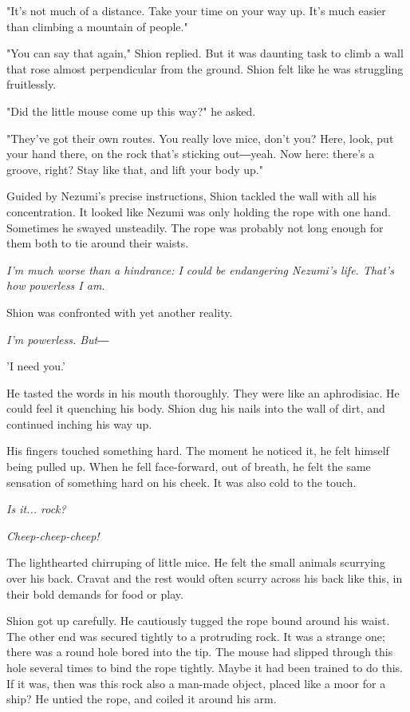 "It's not much of a distance. Take your time on your way up. It's much
easier than climbing a mountain of people."

"You can say that again," Shion replied. But it was daunting task to
climb a wall that rose almost perpendicular from the ground. Shion felt
like he was struggling fruitlessly.

"Did the little mouse come up this way?" he asked.

"They've got their own routes. You really love mice, don't you? Here,
look, put your hand there, on the rock that's sticking out―yeah. Now
here: there's a groove, right? Stay like that, and lift your body up."

Guided by Nezumi's precise instructions, Shion tackled the wall with all
his concentration. It looked like Nezumi was only holding the rope with
one hand. Sometimes he swayed unsteadily. The rope was probably not long
enough for them both to tie around their waists.

\emph{I'm much worse than a hindrance: I could be endangering Nezumi's life.
That's how powerless I am.}

Shion was confronted with yet another reality.

\emph{I'm powerless. But―}

'I need you.'

He tasted the words in his mouth thoroughly. They were like an
aphrodisiac. He could feel it quenching his body. Shion dug his nails
into the wall of dirt, and continued inching his way up.

\myspace

His fingers touched something hard. The moment he noticed it, he felt
himself being pulled up. When he fell face-forward, out of breath, he
felt the same sensation of something hard on his cheek. It was also cold
to the touch.

\emph{Is it... rock?}

\emph{Cheep-cheep-cheep!}

The lighthearted chirruping of little mice. He felt the small animals
scurrying over his back. Cravat and the rest would often scurry across
his back like this, in their bold demands for food or play.

Shion got up carefully. He cautiously tugged the rope bound around his
waist. The other end was secured tightly to a protruding rock. It was a
strange one; there was a round hole bored into the tip. The mouse had
slipped through this hole several times to bind the rope tightly. Maybe
it had been trained to do this. If it was, then was this rock also a
man-made object, placed like a moor for a ship? He untied the rope, and
coiled it around his arm.

